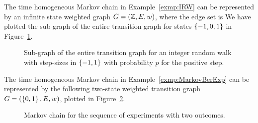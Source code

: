\documentclass[letterpaper,10pt,english]{article}
\begin{document}
\begin{shaded} 
\begin{exmp} 
The time homogeneous Markov chain in Example~\ref{exmp:IRW} %
can be represented by an infinite state weighted graph $G = (\mathbb{Z}, E, w)$, where the edge set is 
We have plotted the sub-graph of the entire transition graph for states $\left\{-1,0,1\right\}$ in Figure~\ref{Fig:RandomWalk}. 
\end{exmp}
\end{shaded}
\begin{figure}[h!]
\centering
\scalebox{1}{}
\caption{Sub-graph of the entire transition graph for an integer random walk with \iid step-sizes in $\left\{-1,1\right\}$ with probability $p$ for the positive step.}
\label{Fig:RandomWalk}
\end{figure}

\begin{shaded} 
\begin{exmp}
The time homogeneous Markov chain in Example~\ref{exmp:MarkovBerExp} can be represented by the following two-state weighted transition graph $G = (\left\{0,1\right\}, E, w)$, 
plotted in Figure~\ref{Fig:TwoStateMC}. 
\end{exmp}
\end{shaded}
\begin{figure}[h!]
\centering
\scalebox{1}{}
\caption{Markov chain for the sequence of experiments with two outcomes.}
\label{Fig:TwoStateMC}
\end{figure}
\end{document}
